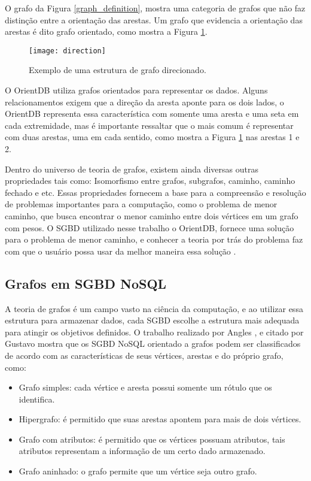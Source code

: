 	O grafo da Figura \ref{graph_definition}, mostra uma categoria de grafos que não faz distinção entre a orientação das arestas. Um grafo que evidencia a orientação das arestas é dito grafo orientado, como mostra a Figura \ref{graph_direction}.
	
\begin{figure}[H]
	\centering
    \texttt{[image: direction]}
    \caption{Exemplo de uma estrutura de grafo direcionado.}
    \label{graph_direction}
\end{figure}

	O OrientDB utiliza grafos orientados para representar os dados. Alguns relacionamentos exigem que a direção da aresta aponte para os dois lados, o OrientDB representa essa característica com somente uma aresta e uma seta em cada extremidade, mas é importante ressaltar que o mais comum é representar com duas arestas, uma em cada sentido, como mostra a Figura \ref{graph_direction} nas arestas 1 e 2.
	
	Dentro do universo de teoria de grafos, existem ainda diversas outras propriedades tais como: Isomorfismo entre grafos, subgrafos, caminho, caminho fechado e etc. Essas propriedades fornecem a base para a compreensão e resolução de problemas importantes para a computação, como o problema de menor caminho, que busca encontrar o menor caminho entre dois vértices em um grafo com pesos. O SGBD utilizado nesse trabalho o OrientDB, fornece uma solução para o problema de menor caminho, e conhecer a teoria por trás do problema faz com que o usuário possa usar da melhor maneira essa solução \cite{orientShortestPath}.
	
\subsection{Grafos em SGBD NoSQL}
	A teoria de grafos é um campo vasto na ciência da computação, e ao utilizar essa estrutura para armazenar dados, cada SGBD escolhe a estrutura mais adequada para atingir os objetivos definidos. O trabalho realizado por Angles \cite{angles2012comparison}, e citado por Gustavo \cite{mdgnosql} mostra que os SGBD NoSQL orientado a grafos podem ser classificados de acordo com as características de seus vértices, arestas e do próprio grafo, como:
\begin{itemize}
		\item Grafo simples: cada vértice e aresta possui somente um rótulo que os identifica.
		\item Hipergrafo: é permitido que suas arestas apontem para mais de dois vértices.
		\item Grafo com atributos: é permitido que os vértices possuam atributos, tais atributos representam a informação de um certo dado armazenado.
		\item Grafo aninhado: o grafo permite que um vértice seja outro grafo.
\end{itemize}

